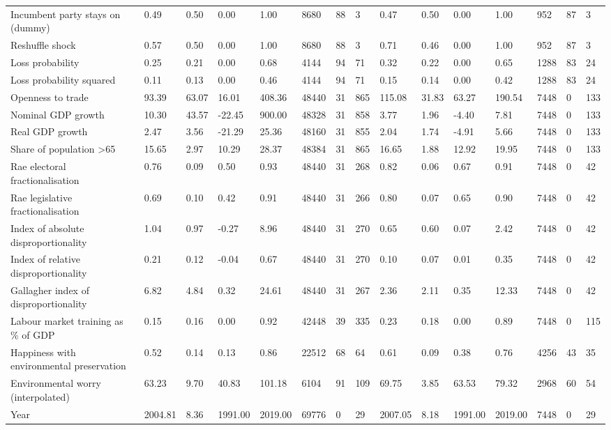 \begin{longtable}{lllllllllllllll}
Incumbent party stays on (dummy) & 0.49 & 0.50 & 0.00 & 1.00 & 8680 & 88 & 3 & 0.47 & 0.50 & 0.00 & 1.00 & 952 & 87 & 3\\
Reshuffle shock & 0.57 & 0.50 & 0.00 & 1.00 & 8680 & 88 & 3 & 0.71 & 0.46 & 0.00 & 1.00 & 952 & 87 & 3\\
\addlinespace
Loss probability & 0.25 & 0.21 & 0.00 & 0.68 & 4144 & 94 & 71 & 0.32 & 0.22 & 0.00 & 0.65 & 1288 & 83 & 24\\
Loss probability squared & 0.11 & 0.13 & 0.00 & 0.46 & 4144 & 94 & 71 & 0.15 & 0.14 & 0.00 & 0.42 & 1288 & 83 & 24\\
Openness to trade & 93.39 & 63.07 & 16.01 & 408.36 & 48440 & 31 & 865 & 115.08 & 31.83 & 63.27 & 190.54 & 7448 & 0 & 133\\
Nominal GDP growth & 10.30 & 43.57 & -22.45 & 900.00 & 48328 & 31 & 858 & 3.77 & 1.96 & -4.40 & 7.81 & 7448 & 0 & 133\\
Real GDP growth & 2.47 & 3.56 & -21.29 & 25.36 & 48160 & 31 & 855 & 2.04 & 1.74 & -4.91 & 5.66 & 7448 & 0 & 133\\
\addlinespace
Share of population >65 & 15.65 & 2.97 & 10.29 & 28.37 & 48384 & 31 & 865 & 16.65 & 1.88 & 12.92 & 19.95 & 7448 & 0 & 133\\
Rae electoral fractionalisation & 0.76 & 0.09 & 0.50 & 0.93 & 48440 & 31 & 268 & 0.82 & 0.06 & 0.67 & 0.91 & 7448 & 0 & 42\\
Rae legislative fractionalisation & 0.69 & 0.10 & 0.42 & 0.91 & 48440 & 31 & 266 & 0.80 & 0.07 & 0.65 & 0.90 & 7448 & 0 & 42\\
Index of absolute disproportionality & 1.04 & 0.97 & -0.27 & 8.96 & 48440 & 31 & 270 & 0.65 & 0.60 & 0.07 & 2.42 & 7448 & 0 & 42\\
Index of relative disproportionality & 0.21 & 0.12 & -0.04 & 0.67 & 48440 & 31 & 270 & 0.10 & 0.07 & 0.01 & 0.35 & 7448 & 0 & 42\\
\addlinespace
Gallagher index of disproportionality & 6.82 & 4.84 & 0.32 & 24.61 & 48440 & 31 & 267 & 2.36 & 2.11 & 0.35 & 12.33 & 7448 & 0 & 42\\
Labour market training as \% of GDP & 0.15 & 0.16 & 0.00 & 0.92 & 42448 & 39 & 335 & 0.23 & 0.18 & 0.00 & 0.89 & 7448 & 0 & 115\\
Happiness with environmental preservation & 0.52 & 0.14 & 0.13 & 0.86 & 22512 & 68 & 64 & 0.61 & 0.09 & 0.38 & 0.76 & 4256 & 43 & 35\\
Environmental worry (interpolated) & 63.23 & 9.70 & 40.83 & 101.18 & 6104 & 91 & 109 & 69.75 & 3.85 & 63.53 & 79.32 & 2968 & 60 & 54\\
Year & 2004.81 & 8.36 & 1991.00 & 2019.00 & 69776 & 0 & 29 & 2007.05 & 8.18 & 1991.00 & 2019.00 & 7448 & 0 & 29\\
\bottomrule
\end{longtable}
